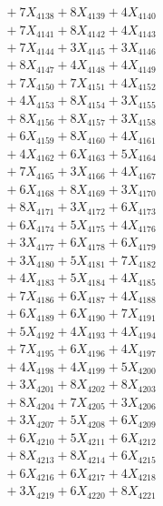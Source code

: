\documentclass[a4paper,10pt]{article}
\begin{document}
{\begin{align}
&\;  + 7 X_{4138} + 8 X_{4139} + 4 X_{4140} \\[0.3ex]
&\;  + 7 X_{4141} + 8 X_{4142} + 4 X_{4143} \\[0.3ex]
&\;  + 7 X_{4144} + 3 X_{4145} + 3 X_{4146} \\[0.3ex]
&\;  + 8 X_{4147} + 4 X_{4148} + 4 X_{4149} \\[0.5ex]\allowbreak
&\;  + 7 X_{4150} + 7 X_{4151} + 4 X_{4152} \\[0.3ex]
&\;  + 4 X_{4153} + 8 X_{4154} + 3 X_{4155} \\[0.3ex]
&\;  + 8 X_{4156} + 8 X_{4157} + 3 X_{4158} \\[0.3ex]
&\;  + 6 X_{4159} + 8 X_{4160} + 4 X_{4161} \\[0.3ex]
&\;  + 4 X_{4162} + 6 X_{4163} + 5 X_{4164} \\[0.3ex]
&\;  + 7 X_{4165} + 3 X_{4166} + 4 X_{4167} \\[0.3ex]
&\;  + 6 X_{4168} + 8 X_{4169} + 3 X_{4170} \\[0.3ex]
&\;  + 8 X_{4171} + 3 X_{4172} + 6 X_{4173} \\[0.3ex]
&\;  + 6 X_{4174} + 5 X_{4175} + 4 X_{4176} \\[0.3ex]
&\;  + 3 X_{4177} + 6 X_{4178} + 6 X_{4179} \\[0.5ex]\allowbreak
&\;  + 3 X_{4180} + 5 X_{4181} + 7 X_{4182} \\[0.3ex]
&\;  + 4 X_{4183} + 5 X_{4184} + 4 X_{4185} \\[0.3ex]
&\;  + 7 X_{4186} + 6 X_{4187} + 4 X_{4188} \\[0.3ex]
&\;  + 6 X_{4189} + 6 X_{4190} + 7 X_{4191} \\[0.3ex]
&\;  + 5 X_{4192} + 4 X_{4193} + 4 X_{4194} \\[0.3ex]
&\;  + 7 X_{4195} + 6 X_{4196} + 4 X_{4197} \\[0.3ex]
&\;  + 4 X_{4198} + 4 X_{4199} + 5 X_{4200} \\[0.3ex]
&\;  + 3 X_{4201} + 8 X_{4202} + 8 X_{4203} \\[0.3ex]
&\;  + 8 X_{4204} + 7 X_{4205} + 3 X_{4206} \\[0.3ex]
&\;  + 3 X_{4207} + 5 X_{4208} + 6 X_{4209} \\[0.5ex]\allowbreak
&\;  + 6 X_{4210} + 5 X_{4211} + 6 X_{4212} \\[0.3ex]
&\;  + 8 X_{4213} + 8 X_{4214} + 6 X_{4215} \\[0.3ex]
&\;  + 6 X_{4216} + 6 X_{4217} + 4 X_{4218} \\[0.3ex]
&\;  + 3 X_{4219} + 6 X_{4220} + 8 X_{4221} \\[0.3ex]

\end{align}}
\end{document}
